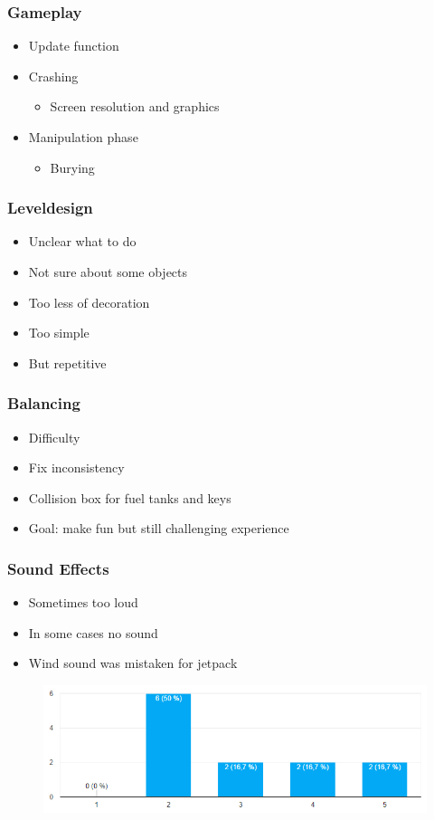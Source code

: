 \documentclass[xcolor=dvipsnames]{beamer}
\begin{document}
	\begin{frame}
		\frametitle{Gameplay}
		\begin{itemize}
			\setlength\itemsep{2em}
			\item Update function
			\item Crashing
			\begin{itemize}
				\item Screen resolution and graphics
			\end{itemize}
			\item Manipulation phase
			\begin{itemize}
				\item Burying
			\end{itemize}
		\end{itemize}
	\end{frame}
	
	\begin{frame}
		\frametitle{Leveldesign}
		\begin{itemize}
			\setlength\itemsep{2em}
			\item Unclear what to do
			\item Not sure about some objects
			\item Too less of decoration
			\item Too simple
			\item But repetitive
		\end{itemize}
	\end{frame}
	
	\begin{frame}
		\frametitle{Balancing}
		\begin{itemize}
			\setlength\itemsep{2em}
			\item Difficulty
			\item Fix inconsistency
			\item Collision box for fuel tanks and keys
			\item Goal: make fun but still challenging experience
		\end{itemize}
	\end{frame}
	
	\begin{frame}
		\frametitle{Sound Effects}
		\begin{itemize}
			\item Sometimes too loud
			\item In some cases no sound
			\item Wind sound was mistaken for jetpack
		\end{itemize}
	\begin{figure}[ht]
		\centering
		\includegraphics[width=\textwidth]{images/playTesting/sound}
	\end{figure}
	\end{frame}
	
\end{document}
